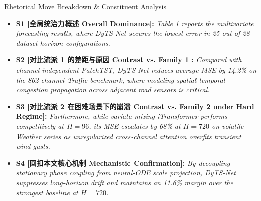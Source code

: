 \begin{TipBox}{Rhetorical Move Breakdown \& Constituent Analysis}
\begin{itemize}[leftmargin=1.5em]
  \item \textbf{S1 [全局统治力概述 Overall Dominance]:} \textit{Table 1 reports the multivariate forecasting results, where DyTS-Net secures the lowest error in 25 out of 28 dataset-horizon configurations.}\par{}
  \item \textbf{S2 [对比流派 1 的差距与原因 Contrast vs. Family 1]:} \textit{Compared with channel-independent PatchTST, DyTS-Net reduces average MSE by 14.2\% on the 862-channel Traffic benchmark, where modeling spatial-temporal congestion propagation across adjacent road sensors is critical.}\par{}
  \item \textbf{S3 [对比流派 2 在困难场景下的崩溃 Contrast vs. Family 2 under Hard Regime]:} \textit{Furthermore, while variate-mixing iTransformer performs competitively at $H=96$, its MSE escalates by 68\% at $H=720$ on volatile Weather series as unregularized cross-channel attention overfits transient wind gusts.}\par{}
  \item \textbf{S4 [回扣本文核心机制 Mechanistic Confirmation]:} \textit{By decoupling stationary phase coupling from neural-ODE scale projection, DyTS-Net suppresses long-horizon drift and maintains an 11.6\% margin over the strongest baseline at $H=720$.}\par{}
\end{itemize}
\end{TipBox}
\medskip
